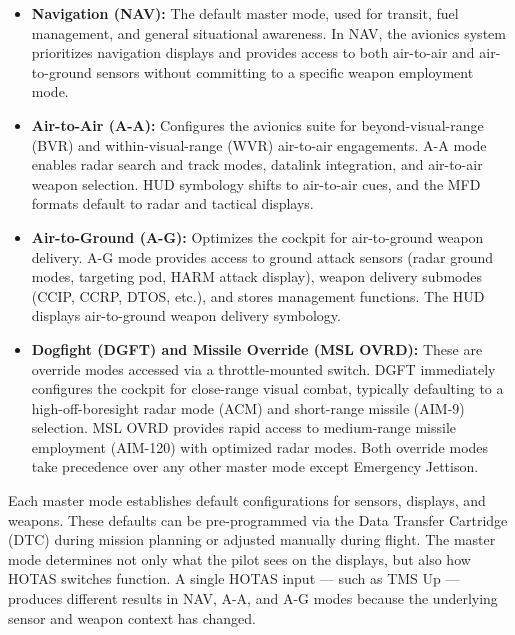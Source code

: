 \documentclass[11pt, a4paper, twoside]{report}
\begin{document}
\begin{itemize}
	\item \textbf{Navigation (NAV):} The default master mode, used for transit, fuel management, and general situational awareness. In NAV, the avionics system prioritizes navigation displays and provides access to both air-to-air and air-to-ground sensors without committing to a specific weapon employment mode.
	
	\item \textbf{Air-to-Air (A-A):} Configures the avionics suite for beyond-visual-range (BVR) and within-visual-range (WVR) air-to-air engagements. A-A mode enables radar search and track modes, datalink integration, and air-to-air weapon selection. HUD symbology shifts to air-to-air cues, and the MFD formats default to radar and tactical displays.
	
	\item \textbf{Air-to-Ground (A-G):} Optimizes the cockpit for air-to-ground weapon delivery. A-G mode provides access to ground attack sensors (radar ground modes, targeting pod, HARM attack display), weapon delivery submodes (CCIP, CCRP, DTOS, etc.), and stores management functions. The HUD displays air-to-ground weapon delivery symbology.
	
	\item \textbf{Dogfight (DGFT) and Missile Override (MSL OVRD):} These are override modes accessed via a throttle-mounted switch. DGFT immediately configures the cockpit for close-range visual combat, typically defaulting to a high-off-boresight radar mode (ACM) and short-range missile (AIM-9) selection. MSL OVRD provides rapid access to medium-range missile employment (AIM-120) with optimized radar modes. Both override modes take precedence over any other master mode except Emergency Jettison.
\end{itemize}

Each master mode establishes default configurations for sensors, displays, and weapons. These defaults can be pre-programmed via the Data Transfer Cartridge (DTC) during mission planning or adjusted manually during flight. The master mode determines not only what the pilot sees on the displays, but also how HOTAS switches function. A single HOTAS input — such as TMS Up — produces different results in NAV, A-A, and A-G modes because the underlying sensor and weapon context has changed.

\end{document}
